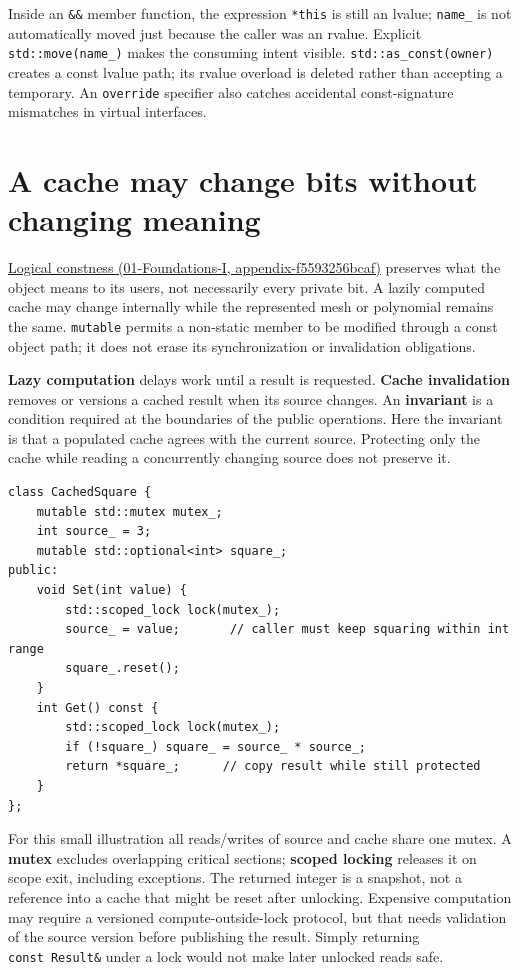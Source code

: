 Inside an \texttt{\&\&} member function, the expression \texttt{*this} is still an lvalue; \texttt{name\_} is not automatically moved just because the caller was an rvalue. Explicit \texttt{std::move(name\_)} makes the consuming intent visible. \texttt{std::as\_const(owner)} creates a const lvalue path; its rvalue overload is deleted rather than accepting a temporary. An \texttt{override} specifier also catches accidental const-signature mismatches in virtual interfaces.

\section{A cache may change bits without changing meaning}\label{05-engine-i-ch003-a-cache-may-change-bits-without-changing-meaning}

\href{../01-Foundations-I/main.pdf\#nameddest=appendix-f5593256bcaf}{Logical constness (01-Foundations-I, appendix-f5593256bcaf)} preserves what the object means to its users, not necessarily every private bit. A lazily computed cache may change internally while the represented mesh or polynomial remains the same. \texttt{mutable} permits a non-static member to be modified through a const object path; it does not erase its synchronization or invalidation obligations.

\textbf{Lazy computation} delays work until a result is requested. \textbf{Cache invalidation} removes or versions a cached result when its source changes. An \textbf{invariant} is a condition required at the boundaries of the public operations. Here the invariant is that a populated cache agrees with the current source. Protecting only the cache while reading a concurrently changing source does not preserve it.

\begin{verbatim}
class CachedSquare {
    mutable std::mutex mutex_;
    int source_ = 3;
    mutable std::optional<int> square_;
public:
    void Set(int value) {
        std::scoped_lock lock(mutex_);
        source_ = value;       // caller must keep squaring within int range
        square_.reset();
    }
    int Get() const {
        std::scoped_lock lock(mutex_);
        if (!square_) square_ = source_ * source_;
        return *square_;      // copy result while still protected
    }
};
\end{verbatim}

For this small illustration all reads/writes of source and cache share one mutex. A \textbf{mutex} excludes overlapping critical sections; \textbf{scoped locking} releases it on scope exit, including exceptions. The returned integer is a snapshot, not a reference into a cache that might be reset after unlocking. Expensive computation may require a versioned compute-outside-lock protocol, but that needs validation of the source version before publishing the result. Simply returning \texttt{const\ Result\&} under a lock would not make later unlocked reads safe.

